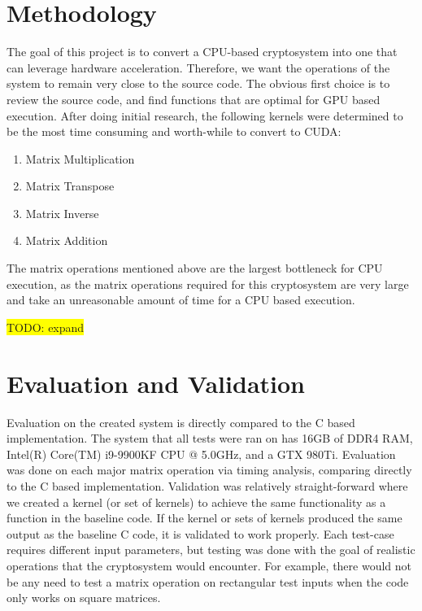 \documentclass[conference]{IEEEtran}
\begin{document}
\section{Methodology}\label{Methodology}
    The goal of this project is to convert a CPU-based cryptosystem into one that can leverage hardware acceleration. Therefore, we want the operations of the system to remain very close to the source code. The obvious first choice is to review the source code, and find functions that are optimal for GPU based execution. After doing initial research, the following kernels were determined to be the most time consuming and worth-while to convert to CUDA:
    
    \begin{enumerate}
        \item Matrix Multiplication
        \item Matrix Transpose
        \item Matrix Inverse
        \item Matrix Addition
    \end{enumerate}
    
    The matrix operations mentioned above are the largest bottleneck for CPU execution, as the matrix operations required for this cryptosystem are very large and take an unreasonable amount of time for a CPU based execution.
    
    
    
    \colorbox{yellow}{TODO: expand}

\section{Evaluation and Validation}\label{Evaluation and Validation}
    Evaluation on the created system is directly compared to the C based implementation. The system that all tests were ran on has 16GB of DDR4 RAM, Intel(R) Core(TM) i9-9900KF CPU @ 5.0GHz, and a GTX 980Ti. Evaluation was done on each major matrix operation via timing analysis, comparing directly to the C based implementation. Validation was relatively straight-forward where we created a kernel (or set of kernels) to achieve the same functionality as a function in the baseline code. If the kernel or sets of kernels produced the same output as the baseline C code, it is validated to work properly. Each test-case requires different input parameters, but testing was done with the goal of realistic operations that the cryptosystem would encounter. For example, there would not be any need to test a matrix operation on rectangular test inputs when the code only works on square matrices.
    
\end{document}
